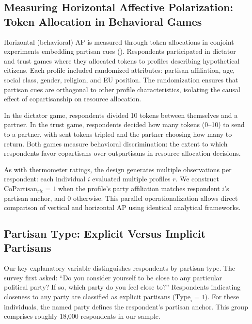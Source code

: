 \documentclass[
  12pt,
  a4paper,
  DIV=11,
  numbers=noendperiod]{scrartcl}
\begin{document}
\subsection{Measuring Horizontal Affective Polarization: Token
Allocation in Behavioral Games}\label{sec-horizontal-measure}

Horizontal (behavioral) AP is measured through token allocations in
conjoint experiments embedding partisan cues
().
Respondents participated in dictator and trust games where they
allocated tokens to profiles describing hypothetical citizens. Each
profile included randomized attributes: partisan affiliation, age,
social class, gender, religion, and EU position. The randomization
ensures that partisan cues are orthogonal to other profile
characteristics, isolating the causal effect of copartisanship on
resource allocation.

In the dictator game, respondents divided 10 tokens between themselves
and a partner. In the trust game, respondents decided how many tokens
(0--10) to send to a partner, with sent tokens tripled and the partner
choosing how many to return. Both games measure behavioral
discrimination: the extent to which respondents favor copartisans over
outpartisans in resource allocation decisions.

As with thermometer ratings, the design generates multiple observations
per respondent: each individual \(i\) evaluated multiple profiles \(r\).
We construct \(\text{CoPartisan}_{ric} = 1\) when the profile's party
affiliation matches respondent \(i\)'s partisan anchor, and 0 otherwise.
This parallel operationalization allows direct comparison of vertical
and horizontal AP using identical analytical frameworks.

\subsection{Partisan Type: Explicit Versus Implicit
Partisans}\label{sec-partisan-type}

Our key explanatory variable distinguishes respondents by partisan type.
The survey first asked: ``Do you consider yourself to be close to any
particular political party? If so, which party do you feel close to?''
Respondents indicating closeness to any party are classified as explicit
partisans (\(\text{Type}_i = 1\)). For these individuals, the named
party defines the respondent's partisan anchor. This group comprises
roughly 18,000 respondents in our sample.
\end{document}
